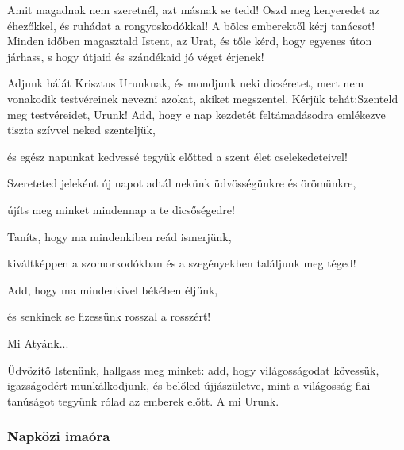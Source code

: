 \documentclass[twoside]{article}
\begin{document}
Amit magadnak nem szeretnél, azt másnak se tedd! Oszd meg kenyeredet az éhezőkkel, és ruhádat a rongyoskodókkal! A bölcs emberektől kérj tanácsot! Minden időben magasztald Istent, az Urat, és tőle kérd, hogy egyenes úton járhass, s hogy útjaid és szándékaid jó véget érjenek!



\begin{preces}{Adjunk hálát Krisztus Urunknak, és mondjunk neki dicséretet, mert nem vonakodik testvéreinek nevezni azokat, akiket megszentel. Kérjük tehát:}{Szenteld meg testvéreidet, Urunk!}
  Add, hogy e nap kezdetét feltámadásodra emlékezve tiszta szívvel neked szenteljük,

  \reddash és egész napunkat kedvessé tegyük előtted a szent élet cselekedeteivel!

  Szereteted jeleként új napot adtál nekünk üdvösségünkre és örömünkre,

  \reddash újíts meg minket mindennap a te dicsőségedre!

  Taníts, hogy ma mindenkiben reád ismerjünk,

  \reddash kiváltképpen a szomorkodókban és a szegényekben találjunk meg téged!

  Add, hogy ma mindenkivel békében éljünk,

  \reddash és senkinek se fizessünk rosszal a rosszért!
\end{preces}
Mi Atyánk...

Üdvözítő Istenünk, hallgass meg minket: add, hogy világosságodat kövessük, igazságodért munkálkodjunk, és belőled újjászületve, mint a világosság fiai tanúságot tegyünk rólad az emberek előtt. A mi Urunk.

\subsubsection*{Napközi imaóra}
\end{document}

